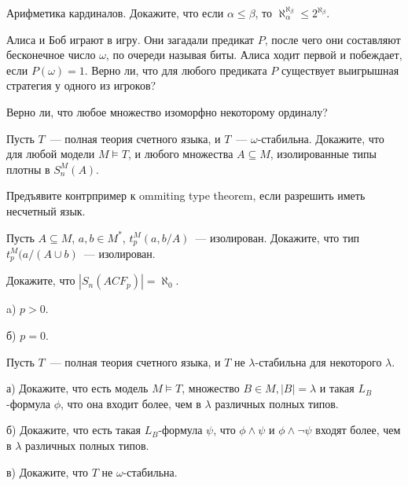 \setcounter{curtask}{1}

\mytitle{}

\begin{task}
    Арифметика кардиналов. Докажите, что если $\alpha \le \beta$, то $\aleph_{\alpha}^{\aleph_{\beta}} \le 2^{\aleph_{\beta}}$.
\end{task}

\begin{task}
	Алиса и Боб играют в игру. Они загадали предикат $P$, после чего они составляют
    бесконечное число $\omega$, по очереди называя биты. Алиса ходит первой и
    побеждает, если $P(\omega) = 1$. Верно ли, что для любого предиката $P$
    существует выигрышная стратегия у одного из игроков?
\end{task}


\begin{task}
    Верно ли, что любое множество изоморфно некоторому ординалу?
\end{task}


\begin{task}
    Пусть $T$~--- полная теория счетного языка, и $T$~---
    $\omega$-стабильна. Докажите, что для любой модели $M \models T$, и любого
    множества $A \subseteq M$, изолированные типы плотны в $S_n^M(A)$. 
\end{task}

\begin{task}
    Предъявите контрпример к ommiting type theorem, если разрешить иметь несчетный
    язык.
\end{task}

\begin{task}
    Пусть $A \subseteq M$, $a, b \in M^{*}$, $t_p^M(a, b / A)$~---
    изолирован. Докажите, что тип $t_p^M(a / (A \cup {b})$~--- изолирован.
\end{task}


\begin{task}
    Докажите, что $|S_n(ACF_p)| = \aleph_0$.

    a) $p > 0$.

    б) $p = 0$.
\end{task}

\begin{task}
    Пусть $T$~--- полная теория счетного языка, и $T$ не $\lambda$-стабильна для
    некоторого $\lambda$.

	а) Докажите, что есть модель $M \models T$, множество $B \in M, |B| = \lambda$
    и такая $L_B$-формула $\phi$, что она входит более, чем в $\lambda$ различных
    полных типов.

    б) Докажите, что есть такая $L_B$-формула $\psi$, что $\phi \land \psi$ и $\phi
    \land \neg \psi$ входят более, чем в $\lambda$ различных полных типов.


    в) Докажите, что $T$ не $\omega$-стабильна.
\end{task}